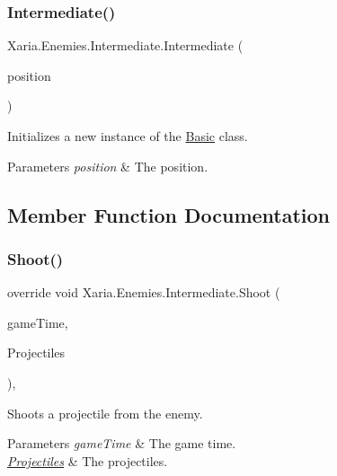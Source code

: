 \subsubsection{\texorpdfstring{Intermediate()}{Intermediate()}}
{\footnotesize\ttfamily Xaria.\+Enemies.\+Intermediate.\+Intermediate (\begin{DoxyParamCaption}\item[{Vector2}]{position }\end{DoxyParamCaption})\hspace{0.3cm}{\ttfamily [inline]}}



Initializes a new instance of the \hyperlink{classXaria_1_1Enemies_1_1Basic}{Basic} class. 


\begin{DoxyParams}{Parameters}
{\em position} & The position.\\
\hline
\end{DoxyParams}


\subsection{Member Function Documentation}
\mbox{\label{classXaria_1_1Enemies_1_1Intermediate_a841e04a489be7bf4a75e002ae8b10dcd}} 
\subsubsection{\texorpdfstring{Shoot()}{Shoot()}}
{\footnotesize\ttfamily override void Xaria.\+Enemies.\+Intermediate.\+Shoot (\begin{DoxyParamCaption}\item[{Game\+Time}]{game\+Time,  }\item[{ref List$<$ \hyperlink{classXaria_1_1Projectile}{Projectile} $>$}]{Projectiles }\end{DoxyParamCaption})\hspace{0.3cm}{\ttfamily [inline]}, {\ttfamily [virtual]}}



Shoots a projectile from the enemy. 


\begin{DoxyParams}{Parameters}
{\em game\+Time} & The game time.\\
\hline
{\em \hyperlink{namespaceXaria_1_1Projectiles}{Projectiles}} & The projectiles.\\
\hline
\end{DoxyParams}


